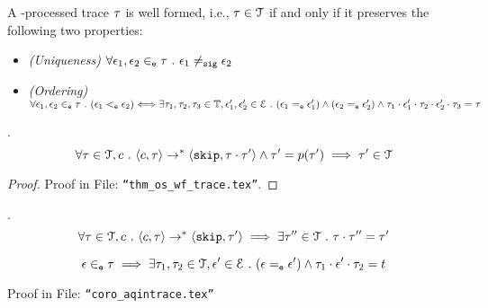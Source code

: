 %
%
%
%
\begin{defn}
\label{def:wf_trace}
A -processed trace $\mathtt{\tau}$ is well formed, i.e., $\mathtt{\tau} \in \mathcal{T}$ if and only if it preserves the following two properties:
\begin{itemize}
\item{\emph{(Uniqueness)}} 
$\forall \mathtt{\epsilon}_1, \mathtt{\epsilon}_2 \in_{\mathtt{e}} \mathtt{\tau} ~.~ \mathtt{\epsilon}_1 \neq_{\mathtt{sig}} \mathtt{\epsilon}_2$
%
\item{\emph{(Ordering)}} $\forall \mathtt{\epsilon}_1, \mathtt{\epsilon}_2 \in_{\mathtt{e}} \mathtt{\tau} ~.~ 
(\mathtt{\epsilon}_1 <_{\mathtt{e}} \mathtt{\epsilon}_2) \Longleftrightarrow
\exists \mathtt{\tau}_1, \mathtt{\tau}_2, \mathtt{\tau}_3 \in \mathbb{T},
 \mathtt{\epsilon}_1', \mathtt{\epsilon}_2' \in \mathcal{E} ~.~
(\mathtt{\epsilon}_1 =_{\mathtt{e}} \mathtt{\epsilon}_1') \land (\mathtt{\epsilon}_2 =_{\mathtt{e}} \mathtt{\epsilon}_2')
\land \mathtt{\tau}_1 \cdot \mathtt{\epsilon}_1' \cdot \mathtt{\tau}_2 \cdot \mathtt{\epsilon}_2' \cdot \mathtt{\tau}_3 = \mathtt{\tau}$
\end{itemize}
\end{defn}
%
%
\begin{thm}.
\label{thm:os_wf_trace}
\\
\[
\forall \mathtt{\tau} \in \mathcal{T}, c ~.~
\langle c, \mathtt{\tau} \rangle \to^{*} \langle \mathtt{skip}, \mathtt{\tau} \cdot \mathtt{\tau}' \rangle \land \mathtt{\tau}' = p(\mathtt{\tau}')
\implies
\mathtt{\tau}' \in \mathcal{T}
\]
%
\end{thm}
\begin{proof}
Proof in File: {\tt ``thm\_os\_wf\_trace.tex''}.
% 
\end{proof}
%
\begin{lem}
.
\\
$$
\forall \mathtt{\tau} \in \mathcal{T}, c ~.~
\langle c, \mathtt{\tau} \rangle \rightarrow^{*} \langle \mathtt{skip}, \mathtt{\tau}' \rangle 
\implies \exists \mathtt{\tau}'' \in \mathcal{T} ~.~ \mathtt{\tau} \cdot \mathtt{\tau}'' = \mathtt{\tau}'
$$
\end{lem}
%
\begin{coro}
\label{coro:aqintrace}
\[
\mathtt{\epsilon} \in_{\mathtt{e}} \mathtt{\tau} \implies \exists \mathtt{\tau}_1, \mathtt{\tau}_2 \in \mathcal{T}, 
\mathtt{\epsilon}' \in \mathcal{E} ~.~ (\mathtt{\epsilon} =_{\mathtt{e}} \mathtt{\epsilon}') \land \mathtt{\tau}_1 \cdot \mathtt{\epsilon}' \cdot \mathtt{\tau}_2 = t  
\]
\end{coro}
\begin{subproof}
Proof in File: {\tt ``coro\_aqintrace.tex''}
% 
%
\end{subproof}
